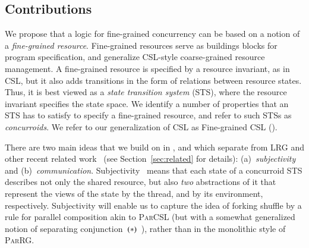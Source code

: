 \subsection{Contributions}
\label{sec:our-approach}
We propose that a logic for fine-grained concurrency can be based on a
notion of a \emph{fine-grained resource}. Fine-grained resources serve
as buildings blocks for program specification, and generalize
CSL-style coarse-grained resource management.
%
%
%
A fine-grained resource is specified by a resource invariant, as in
CSL, but it also adds transitions in the form of relations between
resource states. Thus, it is best viewed as a \emph{state transition
  system} (STS), where the resource invariant specifies the state
space. We identify a number of properties that an STS has to satisfy
to specify a fine-grained resource, and refer to such STSs as
\emph{concurroids}. We refer to our generalization of CSL as
Fine-grained CSL (\SCST).

There are two main ideas that we build on in \SCST, and which separate
\SCST from LRG and other recent related
work~\cite{DinsdaleYoung-al:ECOOP10,Svendsen-al:ESOP13,Turon-al:ICFP13}
(see Section~\ref{sec:related} for details):
(a)~\emph{subjectivity} and (b)~\emph{communication}.
%
Subjectivity~\cite{LeyWild-Nanevski:POPL13} means that each state of a
concurroid STS describes not only the shared resource, but also
\emph{two} abstractions of it that represent the views of the state by
the thread, and by its environment,
respectively. Subjectivity will enable us to capture the idea of
forking shuffle by a rule for parallel composition akin to
\textsc{ParCSL} (but with a somewhat generalized notion of separating
conjunction~$(\ast)$~\cite{LeyWild-Nanevski:POPL13}), rather than in
the monolithic style of \textsc{ParRG}.


